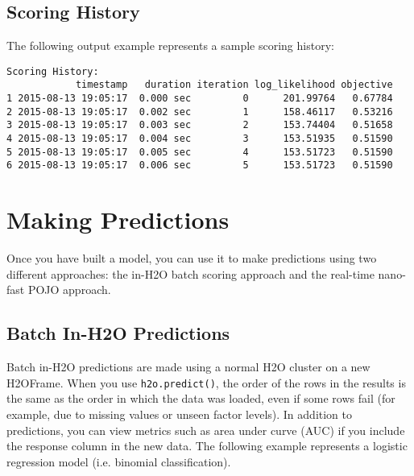 \newpage
\waterExampleInPython


\subsection{Scoring History}

The following output example represents a sample scoring history: 


\waterExampleInPython

\begin{lstlisting}[style=output]
Scoring History:
            timestamp   duration iteration log_likelihood objective
1 2015-08-13 19:05:17  0.000 sec         0      201.99764   0.67784
2 2015-08-13 19:05:17  0.002 sec         1      158.46117   0.53216
3 2015-08-13 19:05:17  0.003 sec         2      153.74404   0.51658
4 2015-08-13 19:05:17  0.004 sec         3      153.51935   0.51590
5 2015-08-13 19:05:17  0.005 sec         4      153.51723   0.51590
6 2015-08-13 19:05:17  0.006 sec         5      153.51723   0.51590
\end{lstlisting}




\section{Making Predictions}

Once you have built a model, you can use it to make predictions using two different approaches:  the in-H2O batch scoring approach and the real-time nano-fast POJO approach.

\subsection{Batch In-H2O Predictions}

Batch in-H2O predictions are made using a normal H2O cluster on a new H2OFrame.  When you use \texttt{h2o.predict()}, the order of the rows in the results is the same as the order in which the data was loaded, even if some rows fail (for example, due to missing values or unseen factor levels). 
In addition to predictions, you can view metrics such as area under curve (AUC) if you include the response column in the new data.  The following example represents a logistic regression model (i.e. binomial classification).

